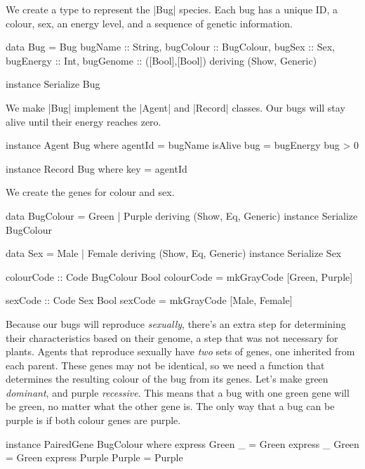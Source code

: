 We create a type to represent the |Bug| species.
Each bug has a unique ID, a colour, sex, an energy level,
and a sequence of genetic information.

\begin{code}
data Bug = Bug
  { 
    bugName :: String,
    bugColour :: BugColour,
    bugSex :: Sex,
    bugEnergy :: Int,
    bugGenome :: ([Bool],[Bool])
  } deriving (Show, Generic)

instance Serialize Bug
\end{code} 

We make |Bug| implement the |Agent| 
and |Record| classes.
Our bugs will stay alive until their energy reaches zero.

\begin{code}
instance Agent Bug where
  agentId = bugName
  isAlive bug = bugEnergy bug > 0

instance Record Bug where key = agentId
\end{code} 

We create the genes for colour and sex.

\begin{code}
data BugColour = Green | Purple deriving (Show, Eq, Generic)
instance Serialize BugColour

data Sex = Male | Female deriving (Show, Eq, Generic)
instance Serialize Sex

colourCode :: Code BugColour Bool
colourCode = mkGrayCode [Green, Purple]

sexCode :: Code Sex Bool
sexCode = mkGrayCode [Male, Female]
\end{code} 

Because our bugs will reproduce \emph{sexually}, there's an extra step for
determining their characteristics based on their genome,
a step that was not necessary for plants.
Agents that reproduce sexually have \emph{two} sets of genes, 
one inherited from each parent.
These genes may not be identical,
so we need a function that determines the resulting colour of the bug
from its genes.
Let's make green \emph{dominant}, and purple \emph{recessive}.
This means that a bug with one green gene will be green,
no matter what the other gene is.
The only way that a bug can be purple is if both colour genes are purple.

\begin{code}
instance PairedGene BugColour where
  express Green _       = Green
  express _ Green       = Green
  express Purple Purple = Purple
\end{code} 

